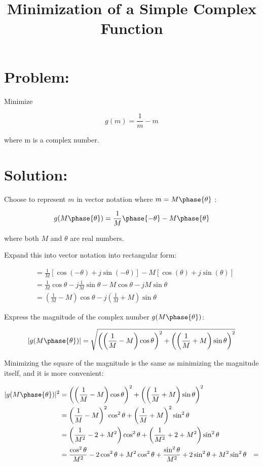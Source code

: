 \documentclass[11pt]{article}
\begin{document}
	
	\title{Minimization of a Simple Complex Function}
	
	\section{Problem:}
	
	Minimize 
	
	\begin{equation}
	g(m) = \frac{1}{m} - m
	\end{equation}
	
	where m is a complex number.
	
	\section{Solution:}
	
	Choose to represent $m$ in vector notation where $m = M\phase{\theta}$ :
	
	\begin{equation}
		g(M\phase{\theta}) = \frac{1}{M}\phase{-\theta} - M\phase{\theta}
	\end{equation}
	
	where both $M$ and $\theta$ are real numbers.
	
	Expand this into vector notation into rectangular form:
	
	\begin{align*}
		&= \frac{1}{M}[\cos{(-\theta)} + j\sin{(-\theta)}] - M[\cos{(\theta)} + j\sin{(\theta)}] \\
		&= \frac{1}{M}\cos{\theta} - j\frac{1}{M}\sin{\theta} - M\cos{\theta} - jM\sin{\theta} \\
		&= (\frac{1}{M}-M)\cos{\theta} - j(\frac{1}{M} + M)\sin{\theta}
	\end{align*}
	
	Express the magnitude of the complex number $g(M\phase{\theta})$:
	
	\begin{equation}
		|g(M\phase{\theta})| = \sqrt{\left(\left(\frac{1}{M}-M\right)\cos{\theta}\right)^2+\left(\left(\frac{1}{M} + M\right)\sin{\theta}\right)^2}
	\end{equation}
	
	Minimizing the square of the magnitude is the same as minimizing the magnitude itself, and it is more convenient:
	
	\begin{align*}
		|g(M\phase{\theta})|^2 &= \left(\left(\frac{1}{M}-M\right)\cos{\theta}\right)^2+\left(\left(\frac{1}{M} + M\right)\sin{\theta}\right)^2 \\
		&= \left(\frac{1}{M}-M\right)^2\cos^{2}{\theta} + \left(\frac{1}{M} + M\right)^2\sin^{2}{\theta} \\
		&= \left(\frac{1}{M^2}-2+M^2\right)\cos^{2}{\theta} + \left(\frac{1}{M^2}+2+M^2\right)\sin^{2}{\theta} \\
		&= \frac{\cos^{2}{\theta}}{M^2} - 2\cos^{2}{\theta} + M^2\cos^{2}{\theta} + \frac{\sin^{2}{\theta}}{M^2} + 2\sin^{2}{\theta} + M^2\sin^{2}{\theta}
		&= 
	\end{align*}
	
\end{document}
